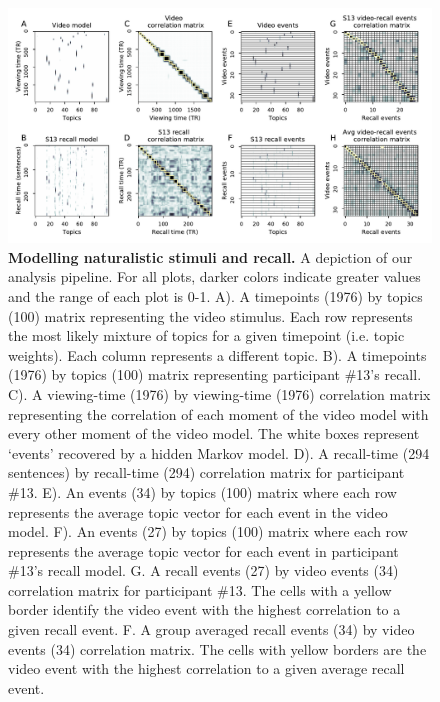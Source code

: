 \documentclass{article}
\begin{document}
{\begin{figure}[ht!]
\centering
\includegraphics[width=\textwidth]{figs/2_eventseg.pdf}
\caption{\small \textbf{Modelling naturalistic stimuli and recall.} A depiction of our analysis pipeline. For all plots, darker colors indicate greater values and the range of each plot is 0-1.  A). A timepoints (1976) by topics (100) matrix representing the video stimulus.  Each row represents the most likely mixture of topics for a given timepoint (i.e. topic weights). Each column represents a different topic. B). A timepoints (1976) by topics (100) matrix representing participant \#13's recall. C). A viewing-time (1976) by viewing-time (1976) correlation matrix representing the correlation of each moment of the video model with every other moment of the video model. The white boxes represent `events' recovered by a hidden Markov model. D). A recall-time (294 sentences) by recall-time (294) correlation matrix for participant \#13. E). An events (34) by topics (100) matrix where each row represents the average topic vector for each event in the video model.  F). An events (27) by topics (100) matrix where each row represents the average topic vector for each event in participant \#13's recall model. G. A recall events (27) by video events (34) correlation matrix for participant \#13. The cells with a yellow border identify the video event with the highest correlation to a given recall event. F. A group averaged recall events (34) by video events (34) correlation matrix.  The cells with yellow borders are the video event with the highest correlation to a given average recall event.}
\label{fig:model}
\end{figure}


}
\end{document}
